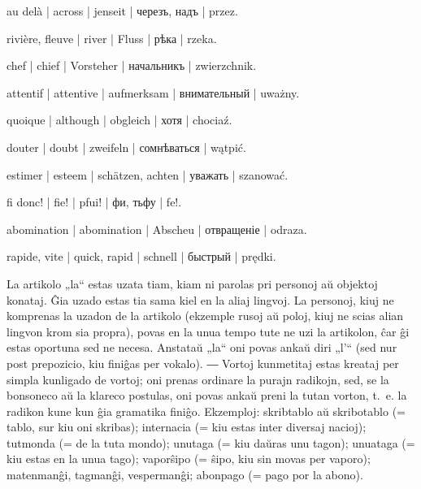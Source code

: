 \begin{ekzvocab}{1em}
 au delà | across | jenseit | черезъ, надъ | przez.

 rivière, fleuve | river | Fluss | рѣка | rzeka.

 chef | chief | Vorsteher | начальникъ | zwierzchnik.

 attentif | attentive | aufmerksam | внимательный | uważny.

 quoique | although | obgleich | хотя | chociaź.

 douter | doubt | zweifeln | сомнѣваться | wątpić.

 estimer | esteem | schätzen, achten | уважать | szanować.

 fi donc! | fie! | pfui! | фи, тьфу | fe!.

 abomination | abomination | Abscheu | отвращеніе | odraza.

 rapide, vite | quick, rapid | schnell | быстрый | prędki.

\end{ekzvocab}



La artikolo „la“ estas uzata tiam, kiam ni parolas pri personoj aŭ objektoj konataj. Ĝia uzado estas tia sama kiel en la aliaj lingvoj. La personoj, kiuj ne komprenas la uzadon de la artikolo (ekzemple rusoj aŭ poloj, kiuj ne scias alian lingvon krom sia propra), povas en la unua tempo tute ne uzi la artikolon, ĉar ĝi estas oportuna sed ne necesa. Anstataŭ „la“ oni povas ankaŭ diri „l’“ (sed nur post prepozicio, kiu finiĝas per vokalo). ― Vortoj kunmetitaj estas kreataj per simpla kunligado de vortoj; oni prenas ordinare la purajn radikojn, sed, se la bonsoneco aŭ la klareco postulas, oni povas ankaŭ preni la tutan vorton, t.~e. la radikon kune kun ĝia gramatika finiĝo. Ekzemploj: skribtablo aŭ skribotablo (= tablo, sur kiu oni skribas); internacia (= kiu estas inter diversaj nacioj); tutmonda (= de la tuta mondo); unutaga (= kiu daŭras unu tagon); unuataga (= kiu estas en la unua tago); vaporŝipo (= ŝipo, kiu sin movas per vaporo); matenmanĝi, tagmanĝi, vespermanĝi; abonpago (= pago por la abono).

